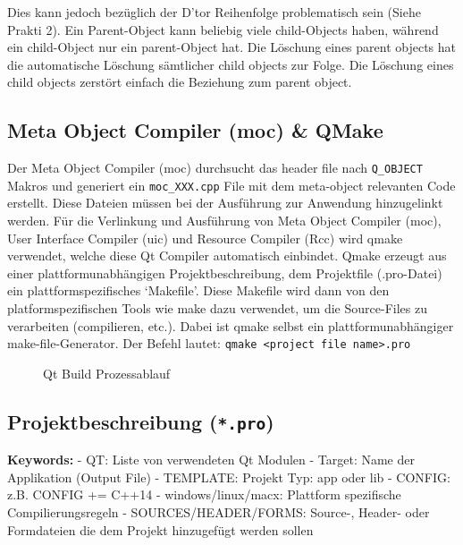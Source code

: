 Dies kann jedoch bezüglich der D'tor Reihenfolge problematisch sein (Siehe Prakti 2).
Ein Parent-Object kann beliebig viele child-Objects haben, während ein child-Object nur ein parent-Object hat. Die Löschung eines parent objects hat die automatische Löschung sämtlicher child objects zur Folge. Die Löschung eines child objects zerstört einfach die Beziehung zum parent object. 

\subsection{Meta Object Compiler (moc) \& QMake}
Der Meta Object Compiler (moc) durchsucht das header file nach \lstinline{Q_OBJECT} Makros und generiert ein \texttt{moc\_XXX.cpp} File mit dem meta-object relevanten Code erstellt. Diese Dateien müssen bei der Ausführung zur Anwendung hinzugelinkt werden. Für die Verlinkung und Ausführung von Meta Object Compiler (moc), User Interface Compiler (uic) und Resource Compiler (Rcc) wird qmake verwendet, welche diese Qt Compiler automatisch einbindet. Qmake erzeugt aus einer plattformunabhängigen Projektbeschreibung, dem Projektfile (.pro-Datei) ein plattformspezifisches `Makefile'. Diese Makefile wird dann von den platformspezifischen Tools wie make dazu verwendet, um die Source-Files zu verarbeiten (compilieren, etc.). Dabei ist qmake selbst ein plattformunabhängiger make-file-Generator.
Der Befehl lautet: \texttt{qmake <project file name>.pro}

\begin{figure}[ht]
    \centering
    \caption{Qt Build Prozessablauf}
\end{figure}

\subsection{Projektbeschreibung (\texttt{*.pro})}
\textbf{Keywords:} 
- QT: Liste von verwendeten Qt Modulen 
- Target: Name der Applikation (Output File) 
- TEMPLATE: Projekt Typ: app oder lib 
- CONFIG: z.B. CONFIG += C++14  
- windows/linux/macx: Plattform spezifische   Compilierungsregeln 
- SOURCES/HEADER/FORMS: Source-, Header- oder Formdateien die dem Projekt hinzugefügt werden sollen 


